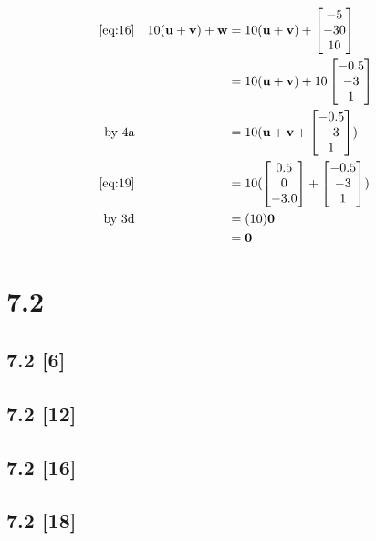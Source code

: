 \documentclass{article}
\begin{document}
\begin{align}
    \label{eq:28}
    \eqref{eq:16} && 10(\textbf{u} + \textbf{v}) + \textbf{w} &= 10(\textbf{u} + \textbf{v}) + \begin{bmatrix} -5\\ -30\\ 10 \end{bmatrix}
    \\
    \label{eq:29}
    && &= 10(\textbf{u} + \textbf{v}) + 10\begin{bmatrix}
    -0.5\\-3\\1
    \end{bmatrix}
    \\
    \label{eq:30}
    \text{by 4a} && &= 10(\textbf{u} + \textbf{v} + \begin{bmatrix}
    -0.5\\-3\\1
    \end{bmatrix})
    \\
    \label{eq:31}
    \eqref{eq:19} && &= 10(\begin{bmatrix}
    0.5\\0\\-3.0
    \end{bmatrix} + \begin{bmatrix}
    -0.5\\-3\\1
    \end{bmatrix})
    \\
    \label{eq:32}
    \text{by 3d} && &= (10)\textbf{0}
    \\
    \label{eq:33}
    && &= \textbf{0}
\end{align}

\newpage

\section*{7.2}
\setcounter{equation}{0}

\subsection*{7.2 [6]}
\subsection*{7.2 [12]}
\subsection*{7.2 [16]}
\subsection*{7.2 [18]}
\end{document}
